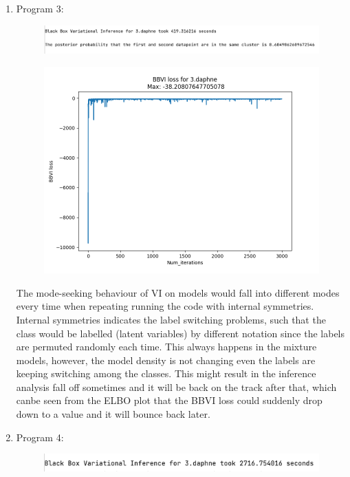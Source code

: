 \documentclass{article}
\begin{document}
\begin{enumerate}
\newpage
\item  Program 3:

\begin{figure}[!ht]
	\centering
	\includegraphics[scale=0.5]{../figs/3_daphne_results}
\end{figure}


\begin{figure}[!ht]
	\centering
	\includegraphics[scale=0.5]{../figs/3_daphne_ELBO}
\end{figure}

The mode-seeking behaviour of VI on models would fall into different modes every time when repeating running the code with internal symmetries.  Internal symmetries indicates the label switching problems, such that the class would be labelled (latent variables) by different notation since the labels are permuted randomly each time. This always happens in the mixture models,  however,  the model density is not changing even the labels are keeping switching among the classes. This might result in the inference analysis fall off sometimes and it will be back on the track after that, which canbe seen from the ELBO plot that the BBVI loss could suddenly drop down to a value and it will bounce back later.


\item  Program 4:

\begin{figure}[!ht]
	\centering
	\includegraphics[scale=0.5]{../figs/4_daphne_results}
\end{figure}


\end{enumerate}
\end{document}
